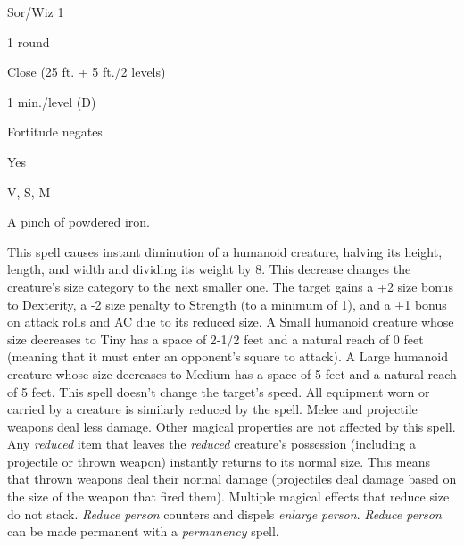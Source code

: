 
\begin{description*}
\item[Level:] Sor/Wiz 1
\item[Casting Time:] 1 round
\item[Range:] Close (25 ft. + 5 ft./2 levels)
\item[Duration:] 1 min./level (D)
\item[Saving Throw:] Fortitude negates
\item[Spell Resistance:] Yes
\item[Components:] V, S, M
\item[Arcane Material Component:] A pinch of powdered iron.
\end{description*}

This spell causes instant diminution of a humanoid creature, halving its height,
length, and width and dividing its weight by 8. This decrease changes the creature's
size category to the next smaller one. The target gains a +2 size bonus to Dexterity,
a -2 size penalty to Strength (to a minimum of 1), and a +1 bonus on attack rolls
and AC due to its reduced size.
A Small humanoid creature whose size decreases to Tiny has a space of 2-1/2 feet
and a natural reach of 0 feet (meaning that it must enter an opponent's square
to attack). A Large humanoid creature whose size decreases to Medium has a space
of 5 feet and a natural reach of 5 feet. This spell doesn't change the target's
speed.
All equipment worn or carried by a creature is similarly reduced by the spell.
Melee and projectile weapons deal less damage. Other magical properties are not
affected by this spell. Any \textit{reduced} item that leaves the \textit{reduced
}creature's possession (including a projectile or thrown weapon) instantly returns
to its normal size. This means that thrown weapons deal their normal damage (projectiles
deal damage based on the size of the weapon that fired them).
Multiple magical effects that reduce size do not stack.
\textit{Reduce person} counters and dispels \textit{enlarge person}.
\textit{Reduce person} can be made permanent with a \textit{permanency} spell.